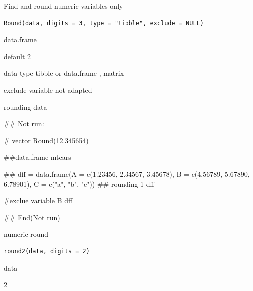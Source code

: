 \documentclass[a4paper]{book}
\begin{document}
%
\begin{Description}
Find and round numeric variables only
\end{Description}
%
\begin{Usage}
\begin{verbatim}
Round(data, digits = 3, type = "tibble", exclude = NULL)
\end{verbatim}
\end{Usage}
%
\begin{Arguments}
\begin{ldescription}
\item[\code{data}] data.frame

\item[\code{digits}] default 2

\item[\code{type}] data type tibble or data.frame , matrix

\item[\code{exclude}] exclude variable not adapted
\end{ldescription}
\end{Arguments}
%
\begin{Value}
rounding data
\end{Value}
%
\begin{Examples}
\begin{ExampleCode}
## Not run: 

# vector
Round(12.345654)

##data.frame
mtcars%

 ##
dff = data.frame(A = c(1.23456, 2.34567, 3.45678),
                 B = c(4.56789, 5.67890, 6.78901),
                C = c("a", "b", "c"))
 ## rounding 1
 dff%

#exclue variable B
 dff%


## End(Not run)
\end{ExampleCode}
\end{Examples}
%
\begin{Description}
numeric round
\end{Description}
%
\begin{Usage}
\begin{verbatim}
round2(data, digits = 2)
\end{verbatim}
\end{Usage}
%
\begin{Arguments}
\begin{ldescription}
\item[\code{data}] data

\item[\code{digits}] 2
\end{ldescription}
\end{Arguments}
\end{document}
